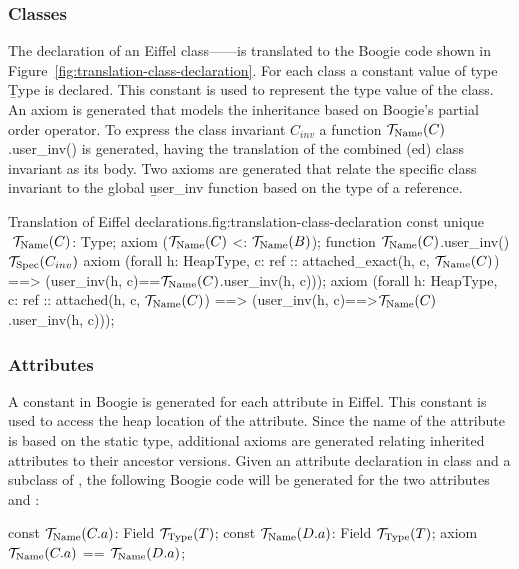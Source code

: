 \subsubsection{Classes}

The declaration of an Eiffel class------is translated to the Boogie code shown in Figure~\ref{fig:translation-class-declaration}. For each class a constant value of type \b{Type} is declared. This constant is used to represent the type value of the class. An axiom is generated that models the inheritance based on Boogie's partial order operator. To express the class invariant $C_{inv}$ a function \b{$\ts{Name}{C}$.user_inv()} is generated, having the translation of the combined (ed) class invariant as its body. Two axioms are generated that relate the specific class invariant to the global \b{user_inv} function based on the type of a reference.

\begin{bfigure}[ht]{Translation of Eiffel  declarations.}{fig:translation-class-declaration}
const unique$\ \ts{Name}{C}$: Type;
axiom ($\ts{Name}{C}$ <:$\ \ts{Name}{B}$);
function $\ts{Name}{C}$.user_inv() { $\ts{Spec}{C_{inv}}$ }
axiom (forall h: HeapType, c: ref :: attached_exact(h, c,$\ \ts{Name}{C}$) ==>
							(user_inv(h, c)==$\ts{Name}{C}$.user_inv(h, c)));
axiom (forall h: HeapType, c: ref :: attached(h, c,$\ \ts{Name}{C}$) ==>
							(user_inv(h, c)==>$\ts{Name}{C}$.user_inv(h, c)));
\end{bfigure}


\subsubsection{Attributes}

A constant in Boogie is generated for each attribute in Eiffel. This constant is used to access the heap location of the attribute. Since the name of the attribute is based on the static type, additional axioms are generated relating inherited attributes to their ancestor versions. Given an attribute declaration  in class  and a subclass  of , the following Boogie code will be generated for the two attributes  and :
\begin{brunning}
const $\ts{Name}{C.a}$: Field $\ts{Type}{T}$;
const $\ts{Name}{D.a}$: Field $\ts{Type}{T}$;
axiom $\ts{Name}{C.a}$ ==$\ \ts{Name}{D.a}$;
\end{brunning}

